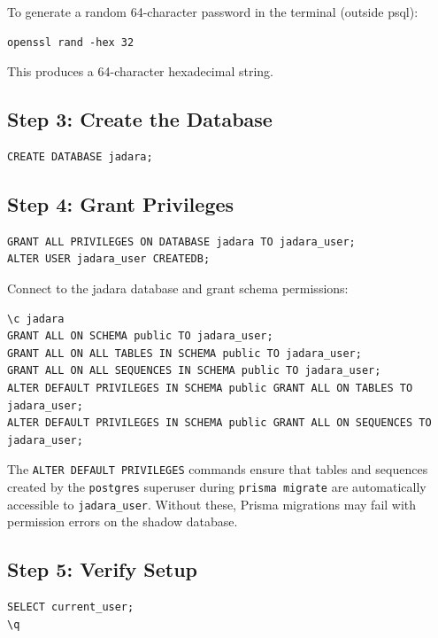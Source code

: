 \documentclass[11pt,a4paper]{article}
\begin{document}
\begin{tipbox}
To generate a random 64-character password in the terminal (outside psql):
\begin{lstlisting}[style=shell]
openssl rand -hex 32
\end{lstlisting}
This produces a 64-character hexadecimal string.
\end{tipbox}

\subsection{Step 3: Create the Database}

\begin{lstlisting}[style=sql]
CREATE DATABASE jadara;
\end{lstlisting}

\subsection{Step 4: Grant Privileges}

\begin{lstlisting}[style=sql]
GRANT ALL PRIVILEGES ON DATABASE jadara TO jadara_user;
ALTER USER jadara_user CREATEDB;
\end{lstlisting}

Connect to the jadara database and grant schema permissions:
\begin{lstlisting}[style=sql]
\c jadara
GRANT ALL ON SCHEMA public TO jadara_user;
GRANT ALL ON ALL TABLES IN SCHEMA public TO jadara_user;
GRANT ALL ON ALL SEQUENCES IN SCHEMA public TO jadara_user;
ALTER DEFAULT PRIVILEGES IN SCHEMA public GRANT ALL ON TABLES TO jadara_user;
ALTER DEFAULT PRIVILEGES IN SCHEMA public GRANT ALL ON SEQUENCES TO jadara_user;
\end{lstlisting}

\begin{notebox}
The \texttt{ALTER DEFAULT PRIVILEGES} commands ensure that tables and sequences created by the \texttt{postgres} superuser during \texttt{prisma migrate} are automatically accessible to \texttt{jadara\_user}. Without these, Prisma migrations may fail with permission errors on the shadow database.
\end{notebox}

\subsection{Step 5: Verify Setup}

\begin{lstlisting}[style=sql]
SELECT current_user;
\q
\end{lstlisting}
\end{document}

